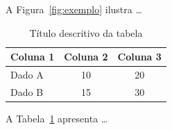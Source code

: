 A Figura~\ref{fig:exemplo} ilustra \ldots

\begin{table}[htb]
  \caption{Título descritivo da tabela}
  \label{tab:exemplo}
  \begin{center}
    \begin{tabular}{lcc}
      \toprule
      \textbf{Coluna 1} & \textbf{Coluna 2} & \textbf{Coluna 3} \\
      \midrule
      Dado A & 10 & 20 \\
      Dado B & 15 & 30 \\
      \bottomrule
    \end{tabular}
  \end{center}
\end{table}

A Tabela~\ref{tab:exemplo} apresenta \ldots
